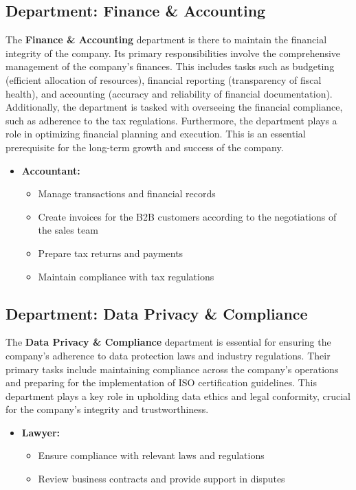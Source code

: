 \subsection{Department: Finance \& Accounting}
The \textbf{Finance \& Accounting} department is there to maintain the financial integrity of the company.
Its primary responsibilities involve the comprehensive management of the company's finances.
This includes tasks such as budgeting (efficient allocation of resources), financial reporting (transparency of fiscal health), and accounting (accuracy and reliability of financial documentation).
Additionally, the department is tasked with overseeing the financial compliance, such as adherence to the tax regulations.
Furthermore, the department plays a role in optimizing financial planning and execution.
This is an essential prerequisite for the long-term growth and success of the company.

\begin{itemize}
    \item \textbf{Accountant:}
    \begin{itemize}
        \item Manage transactions and financial records
        \item Create invoices for the B2B customers according to the negotiations of the sales team
        \item Prepare tax returns and payments
        \item Maintain compliance with tax regulations
    \end{itemize}
\end{itemize}

\subsection{Department: Data Privacy \& Compliance}
The \textbf{Data Privacy \& Compliance} department is essential for ensuring the company's adherence to data protection laws and industry regulations.
Their primary tasks include maintaining compliance across the company's operations and preparing for the implementation of ISO certification guidelines.
This department plays a key role in upholding data ethics and legal conformity, crucial for the company's integrity and trustworthiness.

\begin{itemize}
    \item \textbf{Lawyer:}
            \begin{itemize}
                \item Ensure compliance with relevant laws and regulations
                \item Review business contracts and provide support in disputes
            \end{itemize}
\end{itemize}

